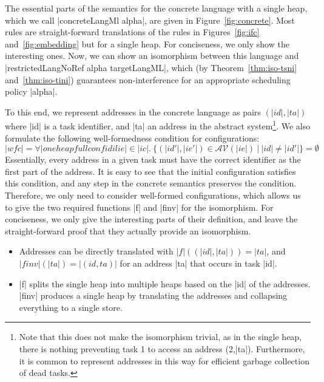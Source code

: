 The essential parts of the semantics for the concrete language
with a single heap,
which we call |concreteLangMl alpha|,
are given in Figure~\ref{fig:concrete}.  Most rules are
straight-forward translations of the rules in Figures~\ref{fig:ifc}
and~\ref{fig:embedding} but for a single heap.  For conciseness, we
only show the interesting ones.
Now, we can show an isomorphism between this language and
|restrictedLangNoRef alpha targetLangML|, which
(by Theorem~\ref{thm:iso-tsni} and~\ref{thm:iso-tini}) guarantees
non-interference for an appropriate scheduling policy |alpha|.

To this end, we represent addresses in the concrete language as
pairs $(|id|,|ta|)$ where |id| is a task identifier, and |ta| an
address in the abstract system\footnote{Note that this does
  not make the isomorphism trivial, as in the single heap, there
  is nothing preventing task 1 to access an address (2,|ta|).
  Furthermore, it is common to represent addresses in this way
  for efficient garbage collection of dead tasks.}.
We also formulate the following well-formedness condition for
configurations:
\[
  |wf c| = \forall |oneheapfullconf id il ie| \in |ic|.\ 
  \{ (|id'|,|ie'|) \in \mathcal{AV}(|ie|) \ \vert\ |id| \neq |id'| \} = \emptyset
\]
Essentially, every address in a given task must have the correct
identifier as the first part of the address.  It is easy to
see that the initial configuration satisfies this condition, and
any step in the concrete semantics preserves the condition.
Therefore, we only need to consider well-formed configurations,
which allows us to give the two required functions
|f| and |finv| for the isomorphism.  For conciseness, we only give
the interesting parts of their definition,
and leave the straight-forward proof that they
actually provide an isomorphism.
\begin{itemize}
  \item Addresses can be directly translated with
  $|f|((|id|,|ta|))=|ta|$, and $|finv|(|ta|)=|(id,ta)|$ for
  an address |ta| that occurs in task |id|.
  \item |f| splits the single heap into multiple heaps based on
  the |id| of the addresses.  |finv| produces a single heap
  by translating the addresses and collapsing everything to a single
  store.
\end{itemize}


